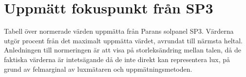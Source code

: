 % 
\section{Uppmätt fokuspunkt från SP3} %
\label{sec:heatmap}

\begin{figure}[hbt]

\setlength\tabcolsep{1 pt}
\def\arraystretch{2}
\centering
\end{figure}

Tabell över normerade värden uppmätta från Parans solpanel SP3. Värderna utgör procent från det maximalt uppmätta värdet, avrundat till närmsta heltal. Anledningen till normeringen är att  visa på storleksändring mellan talen, då de faktiska värderna är intetsägande då de inte direkt kan representera lux, på grund av felmarginal av luxmätaren och uppmätningsmetoden.
% 
